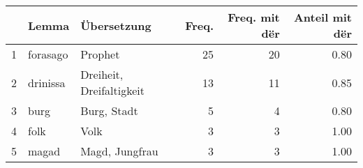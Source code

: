 \begin{tabular}{rllrrr}
  \hline
 & Lemma & Übersetzung & Freq. & Freq. mit dër & Anteil mit dër \\ 
  \hline
1 & forasago & Prophet &  25 &  20 & 0.80 \\ 
  2 & drinissa & Dreiheit, Dreifaltigkeit &  13 &  11 & 0.85 \\ 
  3 & burg & Burg, Stadt &   5 &   4 & 0.80 \\ 
  4 & folk & Volk &   3 &   3 & 1.00 \\ 
  5 & magad & Magd, Jungfrau &   3 &   3 & 1.00 \\ 
   \hline
\end{tabular}
